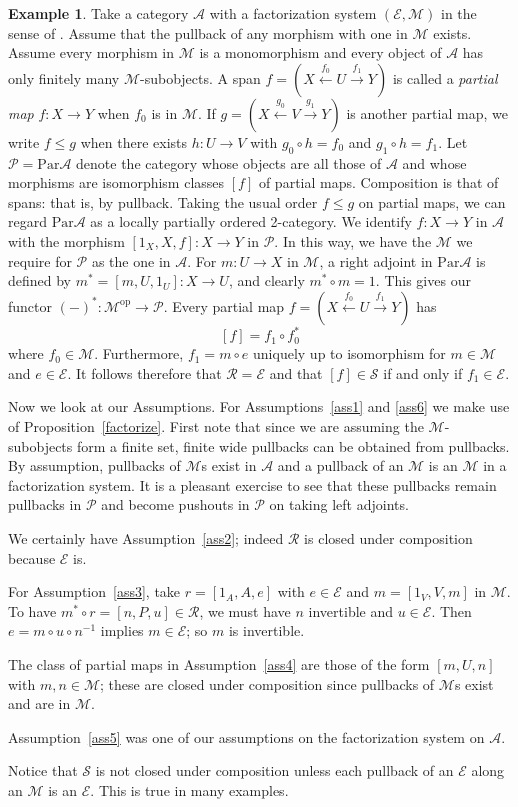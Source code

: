 \documentclass[a4paper,12pt,reqno]{amsart}
\theoremstyle{definition}
\newtheorem{example}[theorem]{Example}
\theoremstyle{fact}
\theoremstyle{genquest}
\theoremstyle{step}
\newcommand{\dd}{\colon}
\newcommand{\lra}{\longrightarrow}
\newcommand{\lla}{\longleftarrow}
\newcommand{\ra}{\rightarrow}
\def\CA{{\mathscr A}}
\def\CE{{\mathscr E}}
\def\CM{{\mathscr M}}
\def\CP{{\mathscr P}}
\def\CR{{\mathscr R}}
\def\CS{{\mathscr S}}
\begin{document}
\begin{example}\label{Ex1+}
Take a category $\CA$ with a factorization system $(\CE,\CM)$ in the sense of \cite{FreydKelly}. 
Assume that the pullback of any morphism with one in $\CM$ exists. 
Assume every morphism in $\CM$ is a monomorphism and every object
of $\CA$ has only finitely many $\CM$-subobjects. 
A span $f = (X\stackrel{f_0}\lla U \stackrel{f_1}\lra Y)$ is called a {\em partial map}
$f \dd X\lra Y$ when $f_0$ is in $\CM$. 
If $g = (X\stackrel{g_0}\lla V \stackrel{g_1}\lra Y)$ is another partial map,
we write $f\le g$ when there exists $h\dd U\ra V$ with $g_0\circ h=f_0$ and $g_1\circ h=f_1$.  
Let $\CP= \mathrm{Par}\CA$ 
denote the category
whose objects are all those of $\CA$ and whose morphisms are isomorphism
classes $[f]$ of partial maps. Composition is that of spans: that is, by pullback.
Taking the usual order $f\le g$ on partial maps, we can regard $\mathrm{Par}\CA$
as a locally partially ordered 2-category.
We identify $f\dd X \ra Y$ in $\CA$ with the morphism $[1_X,X,f] \dd X \lra Y$ in $\CP$.
In this way, we have the $\CM$ we require for $\CP$ as the one in $\CA$.
For $m\dd U\ra X$ in $\CM$, a right adjoint in $\mathrm{Par}\CA$ is defined by 
$m^*= [m,U,1_U] \dd X\ra U$, and clearly $m^*\circ m = 1$.
This gives our functor $(-)^*\dd \CM^{\mathrm{op}} \ra \CP$. 
Every partial map $f = (X\stackrel{f_0}\lla U \stackrel{f_1}\lra Y)$ has 
$$[f] = f_{1}\circ f_0^* $$
where $f_0\in \CM$. Furthermore, $f_1 = m\circ e$ uniquely up to isomorphism
for $m\in \CM$ and $e\in \CE$. 
It follows therefore that $\CR=\CE$ and that $[f]\in \CS$ if and only if $f_1\in \CE$.

Now we look at our Assumptions. For Assumptions~\ref{ass1} and \ref{ass6} we make use of Proposition~\ref{factorize}. First note
that since we are assuming the $\CM$-subobjects form a finite set, 
finite wide pullbacks can be obtained from pullbacks.
By assumption, pullbacks of $\CM$s exist in $\CA$ and a pullback of an 
$\CM$ is an $\CM$ in a factorization system.
It is a pleasant exercise to see that these pullbacks remain pullbacks in $\CP$
and become pushouts in $\CP$ on taking left adjoints. 

We certainly have Assumption~\ref{ass2}; 
indeed $\CR$ is closed under composition because $\CE$ is.

For Assumption~\ref{ass3}, take $r=[1_A,A,e]$ with $e\in \CE$ and 
$m=[1_V,V,m]$ in $\CM$. To have $m^*\circ r = [n,P,u] \in \CR$, we must have
$n$ invertible and $u\in \CE$. Then $e=m\circ u \circ n^{-1}$ implies $m\in \CE$;
so $m$ is invertible. 

The class of partial maps in Assumption~\ref{ass4} are those
of the form $[m,U,n]$ with $m,n\in \CM$; these are closed under composition since
pullbacks of $\CM$s exist and are in $\CM$. 

Assumption~\ref{ass5} was one of our assumptions on the factorization system on $\CA$. 

Notice that $\CS$ is not closed under composition unless each pullback of an $\CE$
along an $\CM$ is an $\CE$. This is true in many examples. 
\end{example}
\end{document}
